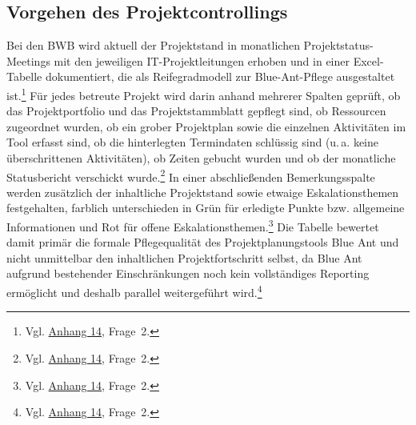 \documentclass[
    12pt, 
    a4paper,
    ]{scrartcl} %
\begin{document}

\subsection{Vorgehen des Projektcontrollings} 
Bei den BWB wird aktuell der Projektstand in monatlichen Projektstatus-Meetings mit den jeweiligen IT-Projektleitungen erhoben und in einer Excel-Tabelle dokumentiert, die als Reifegradmodell zur Blue-Ant-Pflege ausgestaltet ist.\footnote{Vgl. \hyperref[sec:Anhang14]{Anhang 14}, Frage~2.} Für jedes betreute Projekt wird darin anhand mehrerer Spalten geprüft, ob das Projektportfolio und das Projektstammblatt gepflegt sind, ob Ressourcen zugeordnet wurden, ob ein grober Projektplan sowie die einzelnen Aktivitäten im Tool erfasst sind, ob die hinterlegten Termindaten schlüssig sind (u.\,a. keine überschrittenen Aktivitäten), ob Zeiten gebucht wurden und ob der monatliche Statusbericht verschickt wurde.\footnote{Vgl. \hyperref[sec:Anhang14]{Anhang 14}, Frage~2.} In einer abschließenden Bemerkungsspalte werden zusätzlich der inhaltliche Projektstand sowie etwaige Eskalationsthemen festgehalten, farblich unterschieden in Grün für erledigte Punkte bzw. allgemeine Informationen und Rot für offene Eskalationsthemen.\footnote{Vgl. \hyperref[sec:Anhang14]{Anhang 14}, Frage~2.} Die Tabelle bewertet damit primär die formale Pflegequalität des Projektplanungstools Blue Ant und nicht unmittelbar den inhaltlichen Projektfortschritt selbst, da Blue Ant aufgrund bestehender Einschränkungen noch kein vollständiges Reporting ermöglicht und deshalb parallel weitergeführt wird.\footnote{Vgl. \hyperref[sec:Anhang14]{Anhang 14}, Frage~2.}
\end{document}
